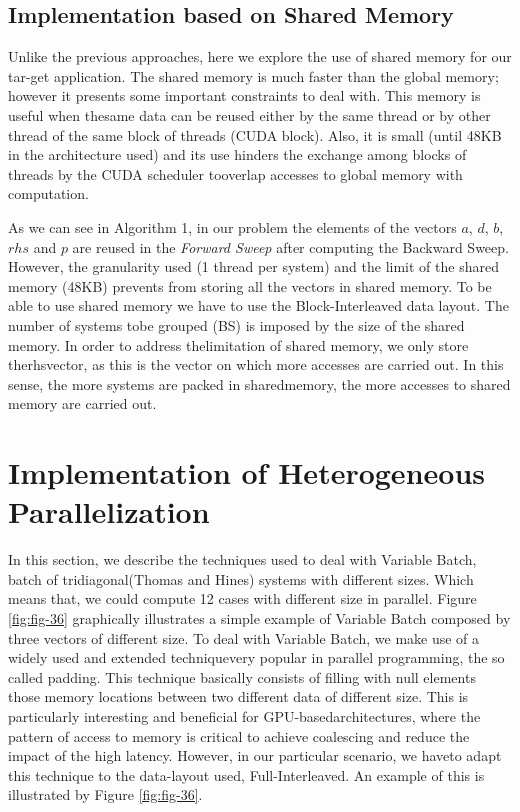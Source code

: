 \subsection*{Implementation based on Shared Memory}
Unlike the previous approaches, here we explore the use of shared
 memory for our tar-get application.  
 The shared memory is much faster than the global memory; 
 however it presents some important constraints to deal with. 
  This memory is useful when thesame  data  can  be  reused  either 
   by  the  same  thread  or  by  other  thread  of  the  same block 
   of threads (CUDA block).  Also, it is small (until 48KB in the 
    architecture used) and its use hinders the exchange among blocks
    of threads by the CUDA scheduler tooverlap accesses to global memory
     with computation.

 As we can see in Algorithm 1, in our problem the elements of the
vectors $a$, $d$, $b$, $rhs$ and $p$ are reused in the \textit{Forward 
 Sweep} after computing the Backward Sweep. However, the granularity used 
 (1 thread per system) and the limit of the shared memory (48KB) prevents
  from storing all the vectors in shared memory. To be able to use 
  shared memory we have to use the Block-Interleaved data layout.  
  The number of systems tobe grouped (BS) is imposed by the size of
   the shared memory.  In order to address thelimitation of shared 
   memory, we only store therhsvector, as this is the vector on which 
   more accesses are carried out.  In this sense,  the more systems 
   are packed in sharedmemory, the more accesses to shared memory 
   are carried out.


\vspace{10ex}
\section{Implementation of Heterogeneous Parallelization}

In  this  section,  we  describe  the  techniques  used  to  deal
with  Variable  Batch,  batch of tridiagonal(Thomas and Hines) 
systems with different sizes. Which means that, we could compute 12 cases with different size in parallel.
 Figure \ref{fig:fig-36} graphically illustrates a 
simple example of Variable Batch composed by three vectors of 
different size.  To deal with Variable Batch, we make use of a 
widely used and extended techniquevery popular in parallel
programming, the so called padding.  This technique basically consists
of  filling  with  null  elements  those  memory  locations  between  two  different data
of  different  size.   This  is  particularly  interesting  and  
beneficial  for  GPU-basedarchitectures, where the pattern of 
access to memory is critical to achieve coalescing and reduce the 
impact of the high latency.  However, in our particular scenario, 
we haveto adapt this technique to the data-layout used, 
Full-Interleaved.  An example of this is illustrated by Figure \ref{fig:fig-36}.

